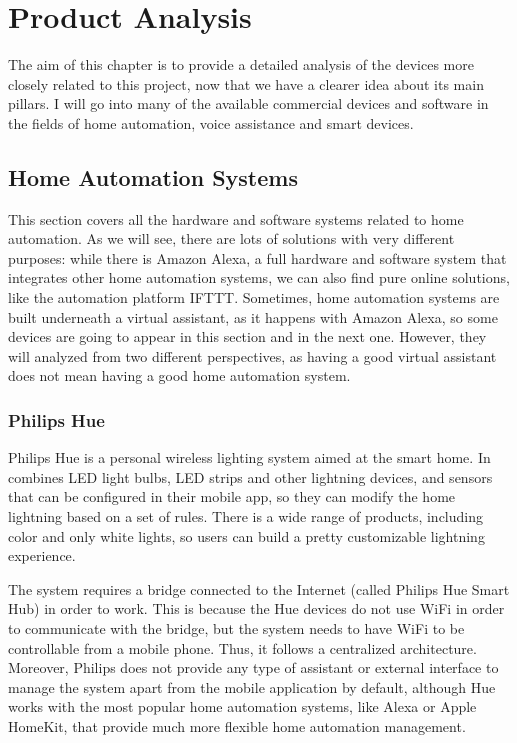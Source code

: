 \chapter{Product Analysis}

The aim of this chapter is to provide a detailed analysis of the devices more closely related to this project, now that we have a 
clearer idea about its main pillars. I will go into many of the available commercial devices and software in the fields of home 
automation, voice assistance and smart devices.

\section{Home Automation Systems}
This section covers all the hardware and software systems related to home automation. As we will see, there are lots of solutions
with very different purposes: while there is Amazon Alexa, a full hardware and software system that integrates other home automation
systems, we can also find pure online solutions, like the automation platform IFTTT. Sometimes, home automation systems are
built underneath a virtual assistant, as it happens with Amazon Alexa, so some devices are going to appear in this section and in the
next one. However, they will analyzed from two different perspectives, as having a good virtual assistant does not mean having a
good home automation system.

\subsection{Philips Hue}
Philips Hue is a personal wireless lighting system aimed at the smart home. In combines LED light bulbs, LED strips and other 
lightning devices, and sensors that can be configured in their mobile app, so they can modify the home lightning based on a set of
rules. There is a wide range of products, including color and only white lights, so users can build a pretty customizable lightning
experience.\cite{philipsHueMeethue}

The system requires a bridge connected to the Internet (called Philips Hue Smart Hub) in order to work. This is because the Hue
devices do not use WiFi in order to communicate with the bridge, but the system needs to have WiFi to be controllable from a 
mobile phone. Thus, it follows a centralized architecture. Moreover, Philips does not provide any type of assistant or external interface
to manage the system apart from the mobile application by default, although Hue works with the most popular home automation
systems, like Alexa or Apple HomeKit, that provide much more flexible home automation management.

